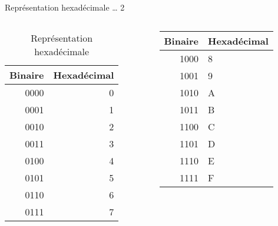 \documentclass[presentation]{beamer}
\begin{document}
\begin{frame}[label={sec:org6300d91}]{Représentation hexadécimale \ldots{} 2}
\begin{columns}
\begin{column}{0.48\columnwidth}
\begin{block}{}
\begin{table}[htbp]
\caption{\label{tab:orgf58d58c}Représentation hexadécimale}
\centering
\begin{tabular}{rr}
Binaire & Hexadécimal\\[0pt]
\hline
0000 & 0\\[0pt]
0001 & 1\\[0pt]
0010 & 2\\[0pt]
0011 & 3\\[0pt]
0100 & 4\\[0pt]
0101 & 5\\[0pt]
0110 & 6\\[0pt]
0111 & 7\\[0pt]
\end{tabular}
\end{table}
\end{block}
\end{column}

\begin{column}{0.48\columnwidth}
\begin{block}{}
\begin{center}
\begin{tabular}{rl}
Binaire & Hexadécimal\\[0pt]
\hline
1000 & 8\\[0pt]
1001 & 9\\[0pt]
1010 & A\\[0pt]
1011 & B\\[0pt]
1100 & C\\[0pt]
1101 & D\\[0pt]
1110 & E\\[0pt]
1111 & F\\[0pt]
\end{tabular}
\end{center}
\end{block}
\end{column}
\end{columns}
\end{frame}
\end{document}
